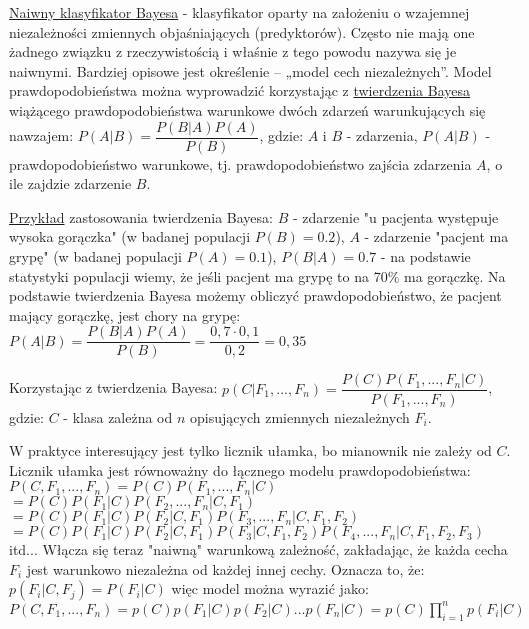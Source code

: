 \underline{Naiwny klasyfikator Bayesa} - klasyfikator oparty na założeniu o wzajemnej niezależności zmiennych objaśniających (predyktorów). Często nie mają one żadnego związku z rzeczywistością i właśnie z tego powodu nazywa się je naiwnymi. Bardziej opisowe jest określenie – „model cech niezależnych”. Model prawdopodobieństwa można wyprowadzić korzystając z \underline{twierdzenia Bayesa} wiążącego prawdopodobieństwa warunkowe dwóch zdarzeń warunkujących się nawzajem:\newline
$ P(A|B) = \dfrac{{P(B|A)P(A)}}{P(B)} $, gdzie:\newline
$ A $ i $ B $ - zdarzenia,\newline
$ P(A|B) $ - prawdopodobieństwo warunkowe, tj. prawdopodobieństwo zajścia zdarzenia $ A $, o ile zajdzie zdarzenie $ B $.

\underline{Przykład} zastosowania twierdzenia Bayesa:\newline
$ B $ -  zdarzenie "u pacjenta występuje wysoka gorączka" (w badanej populacji $ P(B) = 0.2 $),\newline
$ A $ - zdarzenie "pacjent ma grypę" (w badanej populacji $ P(A) = 0.1 $),\newline
$ P(B|A) = 0.7 $ - na podstawie statystyki populacji wiemy, że jeśli pacjent ma grypę to na 70\% ma gorączkę.\newline
Na podstawie twierdzenia Bayesa możemy obliczyć prawdopodobieństwo, że pacjent mający gorączkę, jest chory na grypę:\newline
$ P(A|B) = \dfrac{{P(B|A)P(A)}}{P(B)} = \dfrac{0,7\cdot 0,1}{0,2} = 0,35$ 

Korzystając z twierdzenia Bayesa:\newline
$ p(C|F_1,...,F_n) = \dfrac{P(C)P(F_1,...,F_n|C)}{P(F_1,...,F_n)} $, gdzie:\newline
$ C $ - klasa zależna od $ n $ opisujących zmiennych niezależnych $ F_i $.

W praktyce interesujący jest tylko licznik ułamka, bo mianownik nie zależy od $ C $. Licznik ułamka jest równoważny do łącznego modelu prawdopodobieństwa:\newline
$ P(C, F_1,...,F_n) $\newline $ = P(C)P(F_1,...,F_n|C) $\newline $ = P(C)P(F_1|C)P(F_2,...,F_n|C, F_1) $\newline $ = P(C)P(F_1|C)P(F_2|C, F_1)P(F_3,...,F_n|C, F_1, F_2) $\newline
$ = P(C)P(F_1|C)P(F_2|C, F_1)P(F_3|C, F_1, F_2)P(F_4,...,F_n|C, F_1, F_2, F_3) $\newline itd...\newline
Włącza się teraz "naiwną" warunkową zależność, zakładając, że każda cecha $ F_i $ jest warunkowo niezależna od każdej innej cechy. Oznacza to, że:\newline
$ p(F_i|C, F_j) = P(F_i|C) $ więc model można wyrazić jako:\newline
$ P(C, F_1,...,F_n) = p(C)p(F_1|C)p(F_2|C)...p(F_n|C) = p(C) \prod_{i=1}^{n} p(F_i|C) $

